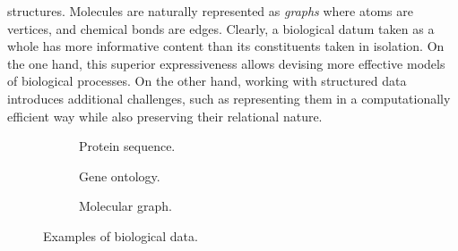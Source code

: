 structures. Molecules are naturally represented as \emph{graphs} where atoms are vertices, and chemical bonds are edges. Clearly, a biological datum taken as a whole has more informative content than its constituents taken in isolation. On the one hand, this superior expressiveness allows devising more effective models of biological processes. On the other hand, working with structured data introduces additional challenges, such as representing them in a computationally efficient way while also preserving their relational nature.

\begin{figure*}[h!]
    \begin{subfigure}[b]{0.32\linewidth}
        \centering
        \resizebox{.9\textwidth}{!}{}
        \caption{Protein sequence.}
        \label{subfig:protein-sequence}
    \end{subfigure}
    \begin{subfigure}[b]{0.36\linewidth}
        \centering
        \resizebox{.9\textwidth}{!}{}
        \caption{Gene ontology.}
        \label{subfig:gene-ontology}
    \end{subfigure}
    \begin{subfigure}[b]{0.28\linewidth}
        \centering
        \resizebox{.7\textwidth}{!}{}
        \caption{Molecular graph.}
        \label{subfig:molecular-graph}
    \end{subfigure}
    \caption{Examples of biological data.}\label{fig:biological-data}
\end{figure*}

